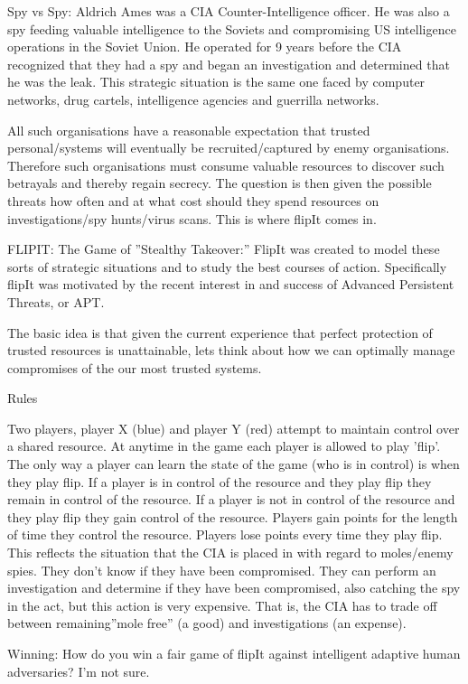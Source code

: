 Spy vs Spy: Aldrich Ames was a CIA Counter-Intelligence officer. He was also a spy feeding valuable intelligence to the Soviets and compromising US intelligence operations in the Soviet Union. He operated for 9 years before the CIA recognized that they had a spy and began an investigation and determined that he was the leak. This strategic situation is the same one faced by computer networks, drug cartels, intelligence agencies and guerrilla networks.

All such organisations have a reasonable expectation that trusted personal/systems will eventually be recruited/captured by enemy organisations. Therefore such organisations must consume valuable resources to discover such betrayals and thereby regain secrecy. The question is then given the possible threats how often and at what cost should they spend resources on investigations/spy hunts/virus scans. This is where flipIt comes in.

FLIPIT: The Game of ''Stealthy Takeover:'' FlipIt was created to model these sorts of strategic situations and to study the best courses of action. Specifically flipIt was motivated by the recent interest in and success of Advanced Persistent Threats, or APT.

The basic idea is that given the current experience that perfect protection of trusted resources is unattainable, lets think about how we can optimally manage compromises of the our most trusted systems.

Rules

Two players, player X (blue) and player Y (red) attempt to maintain control over a shared resource.
At anytime in the game each player is allowed to play 'flip'.
The only way a player can learn the state of the game (who is in control) is when they play flip.
If a player is in control of the resource and they play flip they remain in control of the resource.
If a player is not in control of the resource and they play flip they gain control of the resource.
Players gain points for the length of time they control the resource.
Players lose points every time they play flip.
This reflects the situation that the CIA is placed in with regard to moles/enemy spies. They don't know if they have been compromised. They can perform an investigation and determine if they have been compromised, also catching the spy in the act, but this action is very expensive. That is, the CIA has to trade off between remaining''mole free'' (a good) and investigations (an expense).

Winning: How do you win a fair game of flipIt against intelligent adaptive human adversaries? I'm not sure.

